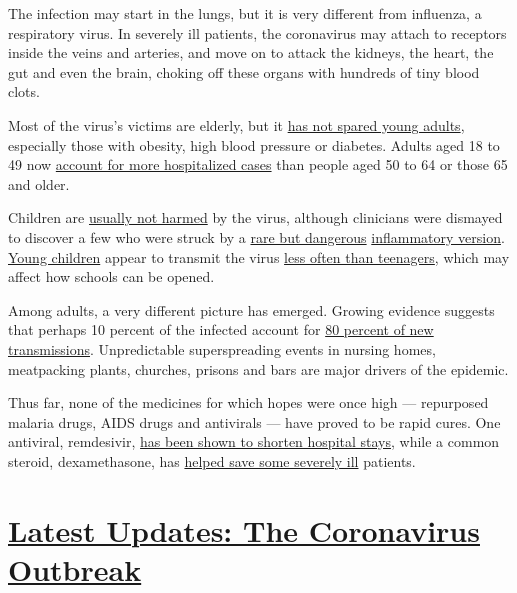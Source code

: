 The infection may start in the lungs, but it is very different from
influenza, a respiratory virus. In severely ill patients, the
coronavirus may attach to receptors inside the veins and arteries, and
move on to attack the kidneys, the heart, the gut and even the brain,
choking off these organs with hundreds of tiny blood clots.

Most of the virus's victims are elderly, but it
\href{https://www.nytimes3xbfgragh.onion/2020/06/25/us/coronavirus-cases-young-people.html}{has
not spared young adults}, especially those with obesity, high blood
pressure or diabetes. Adults aged 18 to 49 now
\href{https://gis.cdc.gov/grasp/COVIDNet/COVID19_5.html}{account for
more hospitalized cases} than people aged 50 to 64 or those 65 and
older.

Children are
\href{https://www.nytimes3xbfgragh.onion/2020/04/06/health/coronavirus-children-us.html}{usually
not harmed} by the virus, although clinicians were dismayed to discover
a few who were struck by a
\href{https://www.nytimes3xbfgragh.onion/2020/05/09/nyregion/coronavirus-new-york-update.html}{rare
but dangerous}
\href{https://www.nytimes3xbfgragh.onion/2020/05/13/health/coronavirus-children-kawasaki-pmis.html}{inflammatory
version}.
\href{https://www.nytimes3xbfgragh.onion/2020/02/05/health/coronavirus-children.html}{Young
children} appear to transmit the virus
\href{https://www.nytimes3xbfgragh.onion/2020/07/18/health/coronavirus-children-schools.html}{less
often than teenagers}, which may affect how schools can be opened.

Among adults, a very different picture has emerged. Growing evidence
suggests that perhaps 10 percent of the infected account for
\href{https://www.nytimes3xbfgragh.onion/2020/06/30/science/how-coronavirus-spreads.html}{80
percent of new transmissions}. Unpredictable superspreading events in
nursing homes, meatpacking plants, churches, prisons and bars are major
drivers of the epidemic.

Thus far, none of the medicines for which hopes were once high ---
repurposed malaria drugs, AIDS drugs and antivirals --- have proved to
be rapid cures. One antiviral, remdesivir,
\href{https://www.nytimes3xbfgragh.onion/2020/04/29/health/gilead-remdesivir-coronavirus.html}{has
been shown to shorten hospital stays}, while a common steroid,
dexamethasone, has
\href{https://www.nytimes3xbfgragh.onion/2020/06/16/world/europe/dexamethasone-coronavirus-covid.html}{helped
save some severely ill} patients.

\hypertarget{latest-updates-the-coronavirus-outbreak}{%
\section{\texorpdfstring{\href{https://www.nytimes3xbfgragh.onion/2020/08/20/world/coronavirus-covid.html?action=click\&pgtype=Article\&state=default\&region=MAIN_CONTENT_1\&context=storylines_live_updates}{Latest
Updates: The Coronavirus
Outbreak}}{Latest Updates: The Coronavirus Outbreak}}\label{latest-updates-the-coronavirus-outbreak}}


